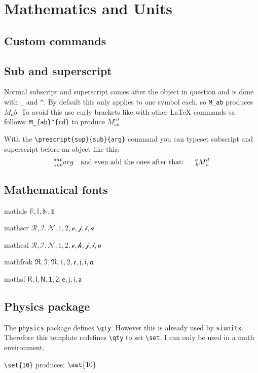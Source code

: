 \section{Mathematics and Units}


\begingroup \small
\subsection{Custom commands}

    \I

\subsection{Sub and superscript}
    Normal subscript and superscript comes after the object in question and is done with \texttt{\_} and \texttt{\^}. By default this only applies to one symbol each, so \verb|M_ab| produces $M_ab$. To avoid this use curly brackets like with other \LaTeX{} commands sa follows: \verb|M_{ab}^{cd}| to produce $M_{ab}^{cd}$

    With the \verb|\prescript{sup}{sub}{arg}| command you can typeset subscript and superscript before an object like this:
    \[  \prescript{sup}{sub}{arg}
        \text{\quad and even add the ones after that: \quad}
        \prescript{a}{b}{M}_c^d \]

\subsection{Mathematical fonts}

    mathds $\mathds{R, I, N, 1}$

    mathscr $\mathscr{R, I, N, 1, 2, e, j, i, a}$

    mathcal $\mathcal{R, I, N, 1, 2, e,h, j, i, a}$

    mathfrak $\mathfrak{R, I, N, 1, 2, e, j, i, a}$

    mathsf $\mathsf{R, I, N, 1, 2, e, j, i, a}$

\subsection{Physics package}

    The \verb|physics| package defines \verb|\qty|. However this is already used by \texttt{siunitx}. Therefore this template redefines \verb|\qty| to set \verb|\set|. I can only be used in a math environment.


    \verb|\set{10}| produces: $\set{10}$

